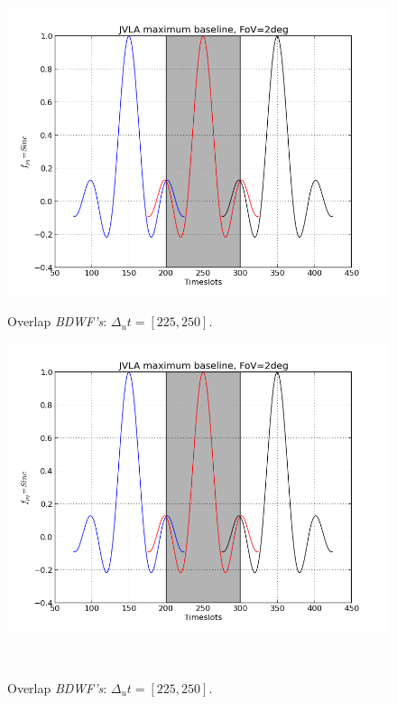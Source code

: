 \documentclass[useAMS,usenatbib]{mn2e}
\begin{document}
\begin{figure}
  \centering
\begin{minipage}{0.38\linewidth}\includegraphics[width=1\textwidth]{./Figures/corrSigVLAMxBl_overlapLdelta.png}\caption{Overlap 
		\textit{BDWF's}: $\Delta_u t= [225, 250]$.}\label{ fig:fig_3a}\end{minipage}
\begin{minipage}{0.38\linewidth}\includegraphics[width=1\textwidth]{./Figures/corrSigVLAMxBl_overlapLdelta.png}\caption{Overlap 
		\textit{BDWF's}: $\Delta_u t= [225, 250]$.}\label{ fig:fig_3a}\end{minipage}\\

\end{figure}
\end{document}
